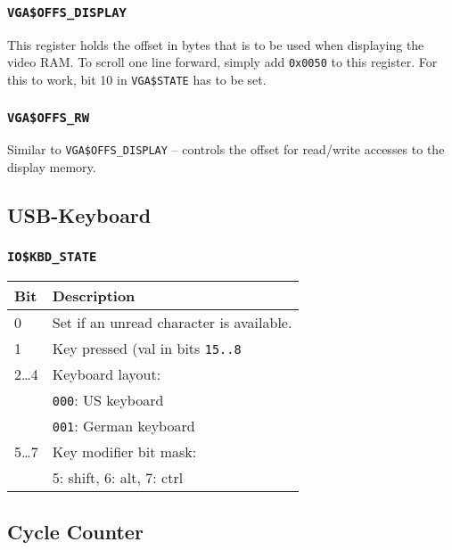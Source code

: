 \documentclass{leaflet}
\begin{document}
   \subsubsection{\texttt{VGA\$OFFS\_DISPLAY}}
    This register holds the offset in bytes that is to be used when displaying
    the video RAM. To scroll one line forward, simply add \texttt{0x0050} to 
    this register. For this to work, bit 10 in \texttt{VGA\$STATE} has to be
    set.
\vspace*{-5mm}
   \subsubsection{\texttt{VGA\$OFFS\_RW}}
    Similar to \texttt{VGA\$OFFS\_DISPLAY} -- controls the offset for 
    read/write accesses to the display memory.
  \subsection{USB-Keyboard}
   \subsubsection{\texttt{IO\$KBD\_STATE}}
    \begin{center}
     \vspace*{-3mm}
{\scriptsize
     \begin{longtable}{|l|l|}
      \hline
       Bit&Description\\
      \hline
      \hline
       0&Set if an unread character is available.\\
       1&Key pressed (val in bits \texttt{15..8}\\
       2\dots 4&Keyboard layout:\\
        &\texttt{000}: US keyboard\\
        &\texttt{001}: German keyboard\\
       5\dots 7&Key modifier bit mask:\\
        &5: shift, 6: alt, 7: ctrl\\
      \hline
     \end{longtable}
}
    \end{center}
    \vspace*{-14mm}
   \subsection{Cycle Counter}
~\vspace*{-10mm}
\end{document}
